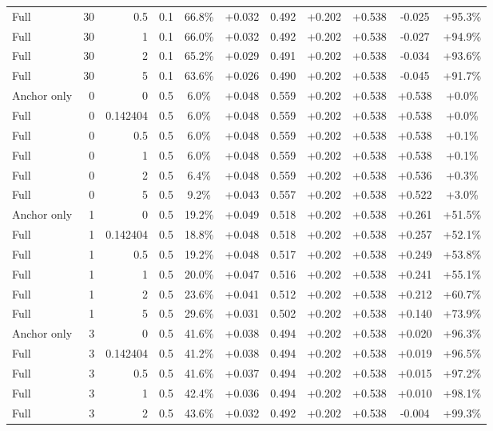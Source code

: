 \begin{table}[htbp]
\begin{tabular}{lrrrccccccc}
Full & 30 & 0.5 & 0.1 & 66.8\% & +0.032 & 0.492 & +0.202 & +0.538 & -0.025 & +95.3\% \\
Full & 30 & 1 & 0.1 & 66.0\% & +0.032 & 0.492 & +0.202 & +0.538 & -0.027 & +94.9\% \\
Full & 30 & 2 & 0.1 & 65.2\% & +0.029 & 0.491 & +0.202 & +0.538 & -0.034 & +93.6\% \\
Full & 30 & 5 & 0.1 & 63.6\% & +0.026 & 0.490 & +0.202 & +0.538 & -0.045 & +91.7\% \\
Anchor only & 0 & 0 & 0.5 & 6.0\% & +0.048 & 0.559 & +0.202 & +0.538 & +0.538 & +0.0\% \\
Full & 0 & 0.142404 & 0.5 & 6.0\% & +0.048 & 0.559 & +0.202 & +0.538 & +0.538 & +0.0\% \\
Full & 0 & 0.5 & 0.5 & 6.0\% & +0.048 & 0.559 & +0.202 & +0.538 & +0.538 & +0.1\% \\
Full & 0 & 1 & 0.5 & 6.0\% & +0.048 & 0.559 & +0.202 & +0.538 & +0.538 & +0.1\% \\
Full & 0 & 2 & 0.5 & 6.4\% & +0.048 & 0.559 & +0.202 & +0.538 & +0.536 & +0.3\% \\
Full & 0 & 5 & 0.5 & 9.2\% & +0.043 & 0.557 & +0.202 & +0.538 & +0.522 & +3.0\% \\
Anchor only & 1 & 0 & 0.5 & 19.2\% & +0.049 & 0.518 & +0.202 & +0.538 & +0.261 & +51.5\% \\
Full & 1 & 0.142404 & 0.5 & 18.8\% & +0.048 & 0.518 & +0.202 & +0.538 & +0.257 & +52.1\% \\
Full & 1 & 0.5 & 0.5 & 19.2\% & +0.048 & 0.517 & +0.202 & +0.538 & +0.249 & +53.8\% \\
Full & 1 & 1 & 0.5 & 20.0\% & +0.047 & 0.516 & +0.202 & +0.538 & +0.241 & +55.1\% \\
Full & 1 & 2 & 0.5 & 23.6\% & +0.041 & 0.512 & +0.202 & +0.538 & +0.212 & +60.7\% \\
Full & 1 & 5 & 0.5 & 29.6\% & +0.031 & 0.502 & +0.202 & +0.538 & +0.140 & +73.9\% \\
Anchor only & 3 & 0 & 0.5 & 41.6\% & +0.038 & 0.494 & +0.202 & +0.538 & +0.020 & +96.3\% \\
Full & 3 & 0.142404 & 0.5 & 41.2\% & +0.038 & 0.494 & +0.202 & +0.538 & +0.019 & +96.5\% \\
Full & 3 & 0.5 & 0.5 & 41.6\% & +0.037 & 0.494 & +0.202 & +0.538 & +0.015 & +97.2\% \\
Full & 3 & 1 & 0.5 & 42.4\% & +0.036 & 0.494 & +0.202 & +0.538 & +0.010 & +98.1\% \\
Full & 3 & 2 & 0.5 & 43.6\% & +0.032 & 0.492 & +0.202 & +0.538 & -0.004 & +99.3\% \\

\end{tabular}
\end{table}
